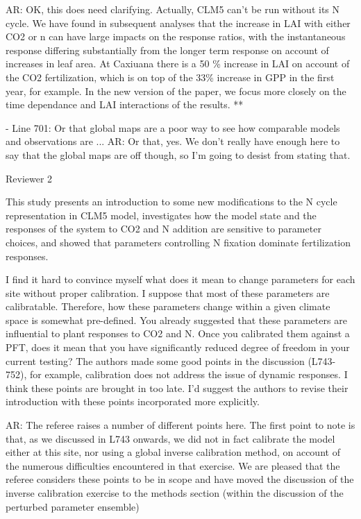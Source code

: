 \documentclass{article}
\begin{document}
\textsf{AR: OK, this does need clarifying. Actually, CLM5 can't be run without its N cycle. We have found in subsequent analyses that the increase in LAI with either CO2 or n can have large impacts on the response ratios, with the instantaneous response differing substantially from the longer term response on account of increases in leaf area. At Caxiuana there is a 50 \% increase in LAI on account of the CO2 fertilization, which is on top of the 33\% increase in GPP in the first year, for example. In the new version of the paper, we focus more closely on the time dependance and LAI interactions of the results. **}

- Line 701: Or that global maps are a poor way to see how comparable models and observations are ... 
\textsf{AR: Or that, yes. We don't really have enough here to say that the global maps are off though, so I'm going to desist from stating that.}

Reviewer 2 

This study presents an introduction to some new modifications to the N cycle representation in CLM5 model, investigates how the model state and the responses of the system to CO2 and N addition are sensitive to parameter choices, and showed that parameters controlling N fixation dominate fertilization responses. 

I find it hard to convince myself what does it mean to change parameters for each site without proper calibration. I suppose that most of these parameters are calibratable. Therefore, how these parameters change within a given climate space is somewhat pre-defined. You already suggested that these parameters are influential to plant responses to CO2 and N. Once you calibrated them against a PFT, does it mean that you have significantly reduced degree of freedom in your current testing? The authors made some good points in the discussion (L743-752), for example, calibration does not address the issue of dynamic responses. I think these points are brought in too late. I'd suggest the authors to revise their introduction with these points incorporated more explicitly.

\textsf{AR: The referee raises a number of different points here. The first point to note is that, as we discussed in L743 onwards, we did not in fact calibrate the model either at this site, nor using a global inverse calibration method, on account of the numerous difficulties encountered in that exercise.  We are pleased that the referee considers these points to be in scope and have moved the discussion of the inverse calibration exercise to the methods section (within the discussion of the perturbed parameter ensemble)}
\end{document}
